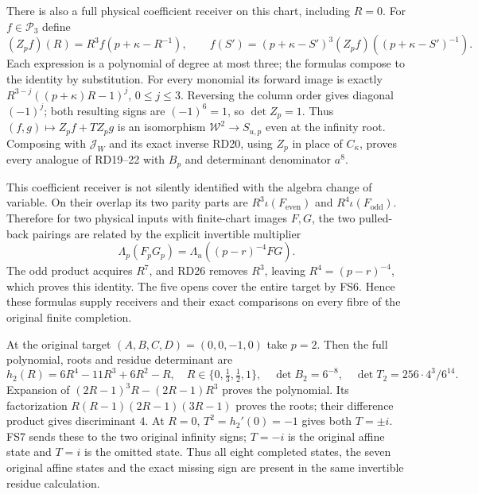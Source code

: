 \documentclass[11pt]{article}
\begin{document}
There is also a full physical coefficient receiver on this
chart, including $R=0$. For $f\in\mathcal P_3$ define
\begin{equation}
 (Z_pf)(R)=R^3 f(p+\kappa-R^{-1}),\qquad
 f(S')=(p+\kappa-S')^3
       (Z_pf)((p+\kappa-S')^{-1}).
 \tag{RD27}
\end{equation}
Each expression is a polynomial of degree at most three;
the formulas compose to the identity by substitution.
For every monomial its forward image is exactly
$R^{3-j}((p+\kappa)R-1)^j$, $0\le j\le3$.
Reversing the column order gives diagonal $(-1)^j$;
both resulting signs are $(-1)^6=1$, so $\det Z_p=1$.
Thus $(f,g)\mapsto Z_pf+T Z_pg$ is an isomorphism
$\mathcal W^2\to S_{u,p}$ even at the infinity root.
Composing with $\mathcal J_W$ and its exact inverse RD20,
using $Z_p$ in place of $C_\kappa$, proves every analogue
of RD19--22 with $B_p$ and determinant denominator $a^8$.

This coefficient receiver is not silently identified with
the algebra change of variable. On their overlap its two
parity parts are $R^3\iota(F_{\mathrm{even}})$ and
$R^4\iota(F_{\mathrm{odd}})$. Therefore for two physical inputs
with finite-chart images $F,G$, the two pulled-back pairings
are related by the explicit invertible multiplier
\begin{equation}
 \Lambda_p(F_pG_p)
       =\Lambda_u((p-r)^{-4}FG).
 \tag{RD28}
\end{equation}
The odd product acquires $R^7$, and RD26 removes $R^3$,
leaving $R^4=(p-r)^{-4}$, which proves this identity.
The five opens cover the entire target by FS6. Hence these
formulas supply receivers and their exact comparisons on
every fibre of the original finite completion.

At the original target $(A,B,C,D)=(0,0,-1,0)$ take $p=2$.
Then the full polynomial, roots and residue determinant are
\begin{equation}
 h_2(R)=6R^4-11R^3+6R^2-R,\quad
 R\in\{0,\tfrac13,\tfrac12,1\},\quad
 \det B_2=6^{-8},\quad
 \det T_2=256\cdot4^3/6^{14}.
 \tag{RD29}
\end{equation}
Expansion of $(2R-1)^3R-(2R-1)R^3$ proves the polynomial.
Its factorization $R(R-1)(2R-1)(3R-1)$ proves the roots;
their difference product gives discriminant $4$.
At $R=0$, $T^2=h_2'(0)=-1$ gives both $T=\pm i$.
FS7 sends these to the two original infinity signs;
$T=-i$ is the original affine state and $T=i$ is the
omitted state. Thus all eight completed states, the seven
original affine states and the exact missing sign are
present in the same invertible residue calculation.
\end{document}
